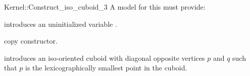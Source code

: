 \begin{ccRefFunctionObjectConcept}{Kernel::Construct_iso_cuboid_3}
A model for this must provide:



\ccHidden {}
             {introduces an uninitialized variable .}

\ccHidden {}
            {copy constructor.}

            {introduces an iso-oriented cuboid  with diagonal
             opposite vertices $p$ and $q$ such that $p$ is the
             lexicographically smallest point in the cuboid.}

\end{ccRefFunctionObjectConcept}
